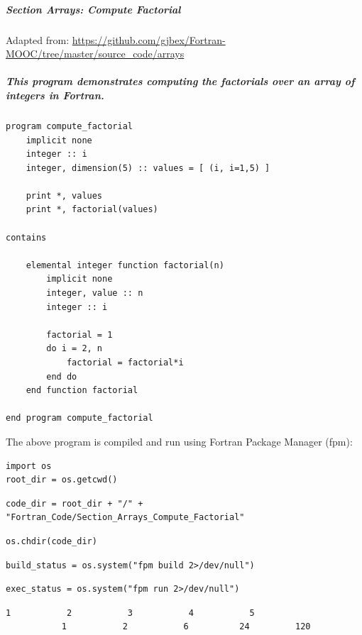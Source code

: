 \subparagraph{Section Arrays: Compute Factorial}

Adapted from: \href{https://github.com/gjbex/Fortran-MOOC/tree/master/source\_code/arrays}{https://github.com/gjbex/Fortran-MOOC/tree/master/source\_code/arrays}

\subparagraph{This program demonstrates computing the factorials over an array of integers in Fortran.}

\begin{verbatim}
program compute_factorial
    implicit none
    integer :: i
    integer, dimension(5) :: values = [ (i, i=1,5) ]

    print *, values
    print *, factorial(values)

contains

    elemental integer function factorial(n)
        implicit none
        integer, value :: n
        integer :: i

        factorial = 1
        do i = 2, n
            factorial = factorial*i
        end do
    end function factorial

end program compute_factorial
\end{verbatim}

The above program is compiled and run using Fortran Package Manager (fpm):

\begin{verbatim}
import os
root_dir = os.getcwd()
\end{verbatim}

\begin{verbatim}
code_dir = root_dir + "/" + "Fortran_Code/Section_Arrays_Compute_Factorial"
\end{verbatim}

\begin{verbatim}
os.chdir(code_dir)
\end{verbatim}

\begin{verbatim}
build_status = os.system("fpm build 2>/dev/null")
\end{verbatim}

\begin{verbatim}
exec_status = os.system("fpm run 2>/dev/null")
\end{verbatim}

\begin{verbatim}
1           2           3           4           5
           1           2           6          24         120
\end{verbatim}